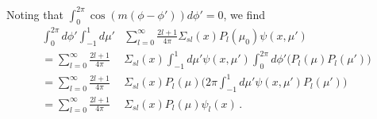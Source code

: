 Noting that $ \int^{2\pi}_{0} \cos(m(\phi-\phi')) d\phi' = 0$, we find
 \begin{equation}
\begin{split}
   \int^{2\pi}_0 d\phi' \int^1_{-1} d\mu'  & \sum^{\infty}_{l=0} \frac{2l+1}{4\pi}  \Sigma_{sl}(x)P_{l}(\mu_0) \psi(x,\mu') \\
  = \sum^{\infty}_{l=0} \frac{2l+1}{4\pi} & \Sigma_{sl}(x) \int^1_{-1} d\mu'  \psi(x,\mu')   \int^{2\pi}_0 d\phi' \Big ( P_l(\mu)P_l(\mu') \Big ) \\
  = \sum^{\infty}_{l=0} \frac{2l+1}{4\pi} & \Sigma_{sl}(x)  P_l(\mu) \Bigg( 2\pi \int^1_{-1} d\mu'  \psi(x,\mu') P_l(\mu')\Bigg )  \\
  = \sum^{\infty}_{l=0} \frac{2l+1}{4\pi} & \Sigma_{sl}(x)  P_l(\mu) \psi_l(x)  \, .
\end{split}
\label{eq:simplescatter}
\end{equation}

